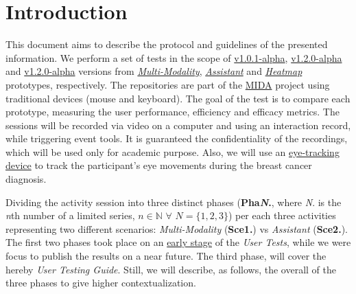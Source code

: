 
\section{Introduction}
\label{sec:sec001}

This document aims to describe the protocol and guidelines of the presented information. We perform a set of tests in the scope of \hyperlink{https://github.com/MIMBCD-UI/prototype-multi-modality/releases/tag/v1.0.1-alpha}{v1.0.1-alpha}, \hyperlink{https://github.com/mida-project/prototype-multi-modality-assistant/releases/tag/v1.2.0-alpha}{v1.2.0-alpha} and \hyperlink{https://github.com/mida-project/prototype-heatmap/releases/tag/v1.2.0-alpha}{v1.2.0-alpha} versions from {\it \hyperlink{https://github.com/MIMBCD-UI/prototype-multi-modality}{Multi-Modality}}, {\it \hyperlink{https://github.com/mida-project/prototype-multi-modality-assistant}{Assistant}} and {\it \hyperlink{https://github.com/mida-project/prototype-heatmap}{Heatmap}} prototypes, respectively. The repositories are part of the \hyperlink{https://mida-project.github.io/}{MIDA} project using traditional devices (mouse and keyboard). The goal of the test is to compare each prototype, measuring the user performance, efficiency and efficacy metrics. The sessions will be recorded via video on a computer and using an interaction record, while triggering event tools. It is guaranteed the confidentiality of the recordings, which will be used only for academic purpose. Also, we will use an \hyperlink{https://gaming.tobii.com/products/}{eye-tracking device} to track the participant's eye movements during the breast cancer diagnosis.

Dividing the activity session into three distinct phases (\textbf{Pha\textit{N}.}, where \textit{N}. is the \textit{n}th number of a limited series, $n \in \mathbb{N}$ $\forall$ $N = \{1, 2, 3\}$) per each three activities representing two different scenarios: \textit{Multi-Modality} (\textbf{Sce1.}) vs \textit{Assistant} (\textbf{Sce2.}). The first two phases took place on an \hyperlink{https://github.com/MIMBCD-UI/testing-guide-breast/tree/master/samples/test_4}{early stage} of the \textit{User Tests}, while we were focus to publish the results on a near future. The third phase, will cover the hereby \textit{User Testing Guide}. Still, we will describe, as follows, the overall of the three phases to give higher contextualization.

